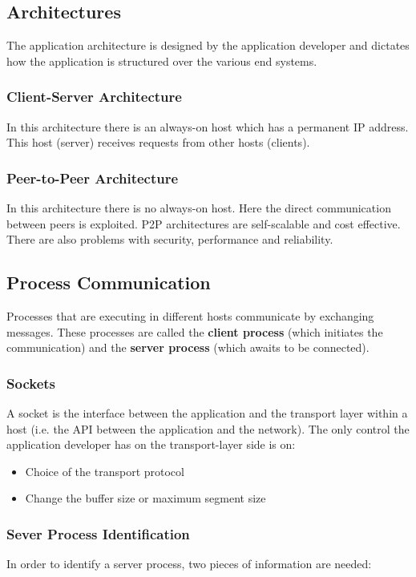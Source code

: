 \documentclass{article}
\begin{document}
\subsection{Architectures}
The application architecture is designed by the application developer and dictates how the application is structured over the various end systems.

\subsubsection{Client-Server Architecture}
In this architecture there is an always-on host which has a permanent IP address. This host (server) receives requests from other hosts (clients).

\subsubsection{Peer-to-Peer Architecture}
In this architecture there is no always-on host. Here the direct communication between peers is exploited. P2P architectures are self-scalable and cost effective. There are also problems with security, performance and reliability.

\subsection{Process Communication}
Processes that are executing in different hosts communicate by exchanging messages. These processes are called the \textbf{client process} (which initiates the communication) and the \textbf{server process} (which awaits to be connected).

\subsubsection{Sockets}
A socket is the interface between the application and the transport layer within a host (i.e. the API between the application and the network). The only control the application developer has on the transport-layer side is on:

\begin{itemize}
	\item Choice of the transport protocol
	\item Change the buffer size or maximum segment size
\end{itemize}

\subsubsection{Sever Process Identification}
In order to identify a server process, two pieces of information are needed:
\end{document}

